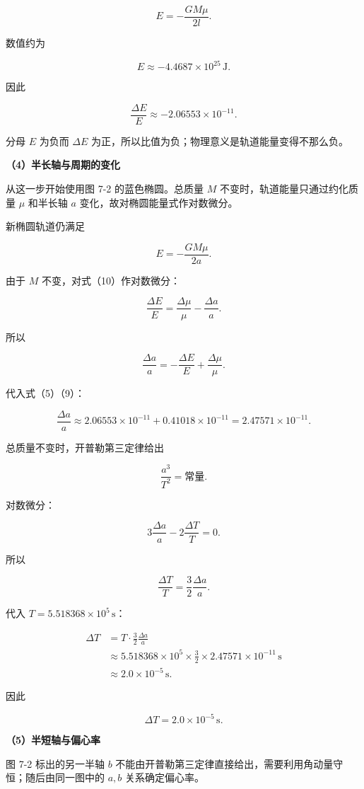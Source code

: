 \documentclass[12pt,a4paper,UTF8]{ctexart}
\begin{document}
\[
E=-\frac{GM\mu}{2l}.
\tag{8}
\]

数值约为

\[
E\approx-4.4687\times10^{25}\,\mathrm J.
\]

因此

\[
\boxed{\frac{\Delta E}{E}\approx-2.06553\times10^{-11}}.
\tag{9}
\]

分母 \(E\) 为负而 \(\Delta E\)
为正，所以比值为负；物理意义是轨道能量变得不那么负。

\textbf{（4）半长轴与周期的变化}

从这一步开始使用图 7-2 的蓝色椭圆。总质量 \(M\)
不变时，轨道能量只通过约化质量 \(\mu\) 和半长轴 \(a\)
变化，故对椭圆能量式作对数微分。

新椭圆轨道仍满足

\[
E=-\frac{GM\mu}{2a}.
\tag{10}
\]

由于 \(M\) 不变，对式（10）作对数微分：

\[
\frac{\Delta E}{E}
=\frac{\Delta\mu}{\mu}-\frac{\Delta a}{a}.
\]

所以

\[
\boxed{
\frac{\Delta a}{a}
=-\frac{\Delta E}{E}+\frac{\Delta\mu}{\mu}
}.
\tag{11}
\]

代入式（5）（9）：

\[
\frac{\Delta a}{a}
\approx2.06553\times10^{-11}+0.41018\times10^{-11}
=2.47571\times10^{-11}.
\tag{12}
\]

总质量不变时，开普勒第三定律给出

\[
\frac{a^3}{T^2}=\text{常量}.
\]

对数微分：

\[
3\frac{\Delta a}{a}-2\frac{\Delta T}{T}=0.
\]

所以

\[
\frac{\Delta T}{T}=\frac32\frac{\Delta a}{a}.
\tag{13}
\]

代入 \(T=5.518368\times10^5\,\mathrm s\)：

\[
\begin{aligned}
\Delta T
&=T\cdot\frac32\frac{\Delta a}{a}\\
&\approx5.518368\times10^5\times\frac32\times2.47571\times10^{-11}\,\mathrm s\\
&\approx2.0\times10^{-5}\,\mathrm s.
\end{aligned}
\]

因此

\[
\boxed{\Delta T=2.0\times10^{-5}\,\mathrm s}.
\tag{14}
\]

\textbf{（5）半短轴与偏心率}

图 7-2 标出的另一半轴 \(b\)
不能由开普勒第三定律直接给出，需要利用角动量守恒；随后由同一图中的
\(a,b\) 关系确定偏心率。
\end{document}
